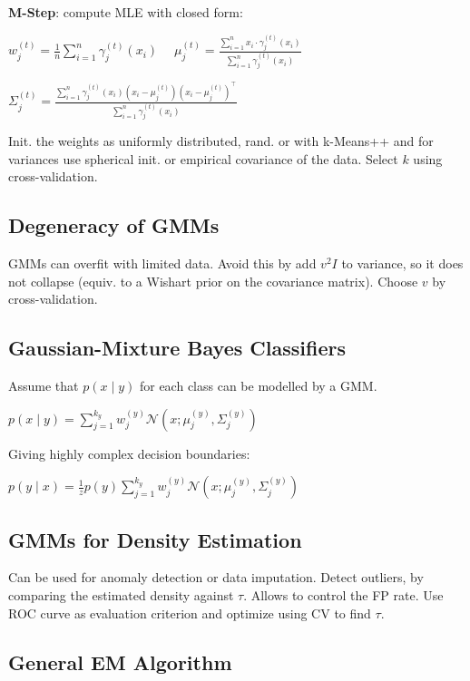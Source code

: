 \textbf{M-Step}: compute MLE with closed form:

$w_j^{(t)} = \frac{1}{n} \sum_{i=1}^n \gamma_j^{(t)}(x_i) \quad \; \mu_j^{(t)} = \frac{\sum_{i=1}^n x_i \cdot \gamma_j^{(t)}(x_i)}{\sum_{i=1}^n \gamma_j^{(t)}(x_i)}$

\qquad \quad $\Sigma_j^{(t)} = \frac{\sum_{i=1}^n \gamma_j^{(t)}(x_i)(x_i - \mu_j^{(t)})(x_i - \mu_j^{(t)})^\top}{\sum_{i=1}^n \gamma_j^{(t)}(x_i)}$


Init. the weights as uniformly distributed, rand. or with k-Means++ and for variances use spherical init. or empirical covariance of the data. Select $k$ using cross-validation.

\subsection*{Degeneracy of GMMs}

GMMs can overfit with limited data. Avoid this by add $v^2 I$ to variance, so it does not collapse (equiv. to a Wishart prior on the covariance matrix). Choose $v$ by cross-validation.

\subsection*{Gaussian-Mixture Bayes Classifiers}

Assume that $p(x \; | \; y)$ for each class can be modelled by a GMM.

\qquad $p(x \; | \; y) = \sum_{j=1}^{k_y} w_j^{(y)} \mathcal{N}(x; \mu_j^{(y)}, \Sigma_j^{(y)})$

Giving highly complex decision boundaries:

\qquad $p(y \; | \; x) = \frac{1}{z} p(y)  \sum_{j=1}^{k_y} w_j^{(y)} \mathcal{N}(x; \mu_j^{(y)}, \Sigma_j^{(y)})$

\subsection*{GMMs for Density Estimation}

Can be used for anomaly detection or data imputation. Detect outliers, by comparing the estimated density against $\tau$. Allows to control the FP rate. Use ROC curve as evaluation criterion and optimize using CV to find $\tau$.

\subsection*{General EM Algorithm}

